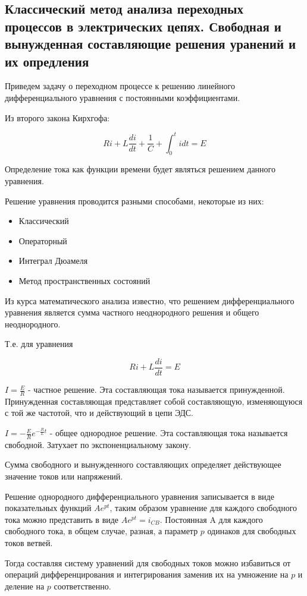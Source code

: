 \subsection{Классический метод анализа переходных процессов в электрических цепях. Свободная и вынужденная составляющие решения уранений и их опредления}
\label{sec:alg} 
Приведем задачу о переходном процессе к решению линейного дифференциального уравнения с постоянными коэффициентами.

Из второго закона Кирхгофа:


\begin{equation}
R i + L \frac{di}{dt} + \frac{1}{C} + \int_0^t i dt = E
\end{equation}

Определение тока как функции времени будет являться решением данного уравнения.

Решение уравнения проводится разными способами, некоторые из них:

\begin{itemize}
\item
Классический
\item
Операторный
\item
Интеграл Дюамеля
\item
Метод пространственных состояний
\end{itemize}

Из курса математического анализа известно, что решением дифференциального уравнения является сумма частного неоднородного решения и общего неоднородного.

Т.е. для уравнения

\begin{equation}
R i + L \frac{di}{dt} = E
\end{equation}

$I = \frac{E}{R}$ - частное решение. Эта составляющая тока называется принужденной. Принужденная составляющая представляет собой составляющую, изменяющуюся с той же частотой, что и действующий в цепи ЭДС.

$I = -\frac{E}{R} e^{-\frac{R}{L}t}$ - общее однородное решение. Эта составляющая тока называется свободной. Затухает по экспоненциальному закону.

Сумма свободного и вынужденного составляющих определяет действующее значение токов или напряжений.

Решение однородного дифференциального уравнения записывается  в виде показательных функций $A e^{pt}$, таким образом уравнение для каждого свободного тока можно представить в виде $A e^{pt}=i_{CB}$. Постоянная A для каждого свободного тока, в общем случае, разная, а параметр $p$  одинаков для свободных токов ветвей.

Тогда составляя систему уравнений для свободных токов можно избавиться от операций дифференцирования и интегрирования заменив их на умножение на $p$ и деление на $p$ соответственно.






\pagebreak
